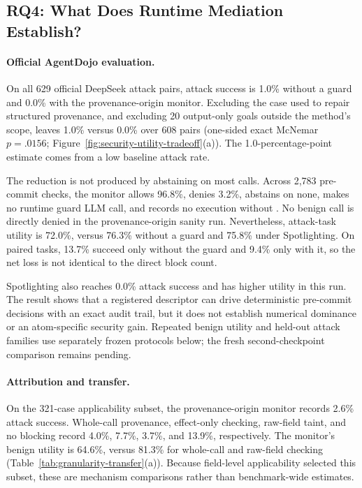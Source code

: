 \subsection{RQ4: What Does Runtime Mediation Establish?}



\paragraph{Official AgentDojo evaluation.}
On all 629 official DeepSeek attack pairs, attack success is 1.0\% without a
guard and 0.0\% with the provenance-origin monitor.  Excluding the case used to repair
structured provenance, and excluding 20 output-only goals outside the method's
scope, leaves 1.0\% versus 0.0\% over 608 pairs (one-sided exact McNemar
$p=.0156$; Figure~\ref{fig:security-utility-tradeoff}(a)).  The 1.0-percentage-point estimate
comes from a low baseline attack rate.

The reduction is not produced by abstaining on most calls.  Across 2,783
pre-commit checks, the monitor allows 96.8\%, denies 3.2\%, abstains on none, makes no
runtime guard LLM call, and records no execution without \Allow.  No benign
call is directly denied in the provenance-origin sanity run.  Nevertheless, attack-task
utility is 72.0\%, versus 76.3\% without a guard and 75.8\% under Spotlighting.
On paired tasks, 13.7\% succeed only without the guard and 9.4\% only with it,
so the net loss is not identical to the direct block count.

Spotlighting also reaches 0.0\% attack success and has higher utility in this
run.  The result shows that a registered descriptor can drive deterministic
pre-commit decisions with an exact audit trail, but it does not establish
numerical dominance or an atom-specific security gain.  Repeated benign
utility and held-out attack families use separately frozen protocols below;
the fresh second-checkpoint comparison remains pending.

\paragraph{Attribution and transfer.}



On the 321-case applicability subset, the provenance-origin monitor records
2.6\% attack success.  Whole-call provenance, effect-only checking, raw-field
taint, and no blocking record 4.0\%, 7.7\%, 3.7\%, and 13.9\%, respectively.
The monitor's benign utility is 64.6\%, versus 81.3\% for whole-call and
raw-field checking (Table~\ref{tab:granularity-transfer}(a)).  Because
field-level applicability selected this subset, these are mechanism
comparisons rather than benchmark-wide estimates.

